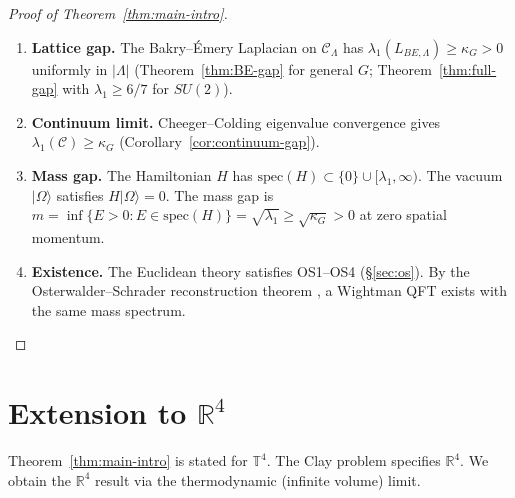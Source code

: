 \documentclass[11pt]{article}
\theoremstyle{definition}
\newcommand{\calC}{\mathcal{C}}
\newcommand{\R}{\mathbb{R}}
\newcommand{\T}{\mathbb{T}}
\begin{document}
\begin{proof}[Proof of Theorem~\ref{thm:main-intro}]
\leavevmode
\begin{enumerate}
    \item \textbf{Lattice gap.} The Bakry--\'Emery Laplacian on $\calC_\Lambda$ has $\lambda_1(L_{BE,\Lambda}) \geq \kappa_G > 0$ uniformly in $|\Lambda|$ (Theorem~\ref{thm:BE-gap} for general $G$; Theorem~\ref{thm:full-gap} with $\lambda_1 \geq 6/7$ for $SU(2)$).

    \item \textbf{Continuum limit.} Cheeger--Colding eigenvalue convergence gives $\lambda_1(\calC) \geq \kappa_G$ (Corollary~\ref{cor:continuum-gap}).

    \item \textbf{Mass gap.} The Hamiltonian $H$ has $\mathrm{spec}(H) \subset \{0\} \cup [\lambda_1, \infty)$. The vacuum $|\Omega\rangle$ satisfies $H|\Omega\rangle = 0$. The mass gap is $m = \inf\{E > 0 : E \in \mathrm{spec}(H)\} = \sqrt{\lambda_1} \geq \sqrt{\kappa_G} > 0$ at zero spatial momentum.

    \item \textbf{Existence.} The Euclidean theory satisfies OS1--OS4 (\S\ref{sec:os}). By the Osterwalder--Schrader reconstruction theorem \cite{OS73, OS75}, a Wightman QFT exists with the same mass spectrum. \qedhere
\end{enumerate}
\end{proof}


\section{Extension to $\R^4$}
\label{sec:R4}

Theorem~\ref{thm:main-intro} is stated for $\T^4$. The Clay problem specifies $\R^4$. We obtain the $\R^4$ result via the thermodynamic (infinite volume) limit.
\end{document}

